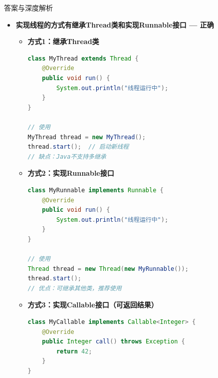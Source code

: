 \documentclass[12pt, a4paper]{ctexart}
\begin{document}
\begin{enumerate}[label=\textbf{\arabic*.}]
\begin{bluebox}{答案与深度解析}
\begin{itemize}[leftmargin=*, nosep, label={}]
\begin{itemize}[label={}, leftmargin=*, nosep]
\begin{lstlisting}[language=Java]
        // 本地变量（栈内存）：每个线程独立
        Thread t1 = new Thread(() -> {
            int localVar = 100;  // 线程1栈中的变量
        });
        Thread t2 = new Thread(() -> {
            int localVar = 200;  // 线程2栈中的变量
            // localVar1和localVar2互不影响
        });
    }
}

class SharedObject {
    // 对象字段在堆中，多线程共享
    private int counter = 0;

    public void increment() {
        this.counter++;
    }
}
// 线程共享堆内存中的对象和静态变量
// 但每个线程有独立的栈空间存放局部变量
				      \end{lstlisting}
				            \item \textbf{重点提示}：
				                  \begin{itemize}[label={}, nosep]
					                  \item 可以共享：堆中的实例对象、静态变量、数组
					                  \item 不共享：局部变量、方法参数、异常表、栈帧
					                  \item 同一块栈内存不能被多个线程同时访问（线程安全）
				                  \end{itemize}
			            \end{itemize}

			      \item[C] \textbf{实现线程的方式有继承Thread类和实现Runnable接口 — 正确}
			            \begin{itemize}[label={}, leftmargin=*, nosep]
				            \item \textbf{方式1：继承Thread类}
				                  \begin{lstlisting}[language=Java]
class MyThread extends Thread {
    @Override
    public void run() {
        System.out.println("线程运行中");
    }
}

// 使用
MyThread thread = new MyThread();
thread.start();  // 启动新线程
// 缺点：Java不支持多继承
				            \end{lstlisting}
				            \item \textbf{方式2：实现Runnable接口}
				                  \begin{lstlisting}[language=Java]
class MyRunnable implements Runnable {
    @Override
    public void run() {
        System.out.println("线程运行中");
    }
}

// 使用
Thread thread = new Thread(new MyRunnable());
thread.start();
// 优点：可继承其他类，推荐使用
				            \end{lstlisting}
				            \item \textbf{方式3：实现Callable接口（可返回结果）}
				                  \begin{lstlisting}[language=Java]
class MyCallable implements Callable<Integer> {
    @Override
    public Integer call() throws Exception {
        return 42;
    }
}


\end{lstlisting}
\end{itemize}
\end{itemize}
\end{bluebox}
\end{enumerate}
\end{document}
